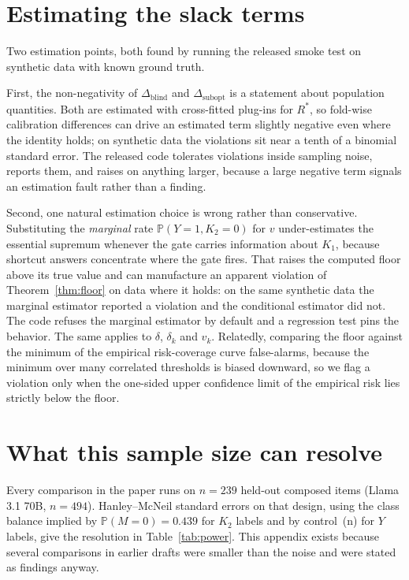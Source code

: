 \documentclass{article}
\begin{document}
\section{Estimating the slack terms}
\label{app:estimation}

Two estimation points, both found by running the released smoke test on synthetic data with known
ground truth.

First, the non-negativity of $\Delta_{\mathrm{blind}}$ and $\Delta_{\mathrm{subopt}}$ is a statement
about population quantities. Both are estimated with cross-fitted plug-ins for $R^\ast$, so fold-wise
calibration differences can drive an estimated term slightly negative even where the identity holds;
on synthetic data the violations sit near a tenth of a binomial standard error. The released code
tolerates violations inside sampling noise, reports them, and raises on anything larger, because a
large negative term signals an estimation fault rather than a finding.

Second, one natural estimation choice is wrong rather than conservative. Substituting the
\emph{marginal} rate $\mathbb{P}(Y=1,K_2=0)$ for $v$ under-estimates the essential supremum whenever
the gate carries information about $K_1$, because shortcut answers concentrate where the gate fires.
That raises the computed floor above its true value and can manufacture an apparent violation of
Theorem~\ref{thm:floor} on data where it holds: on the same synthetic data the marginal estimator
reported a violation and the conditional estimator did not. The code refuses the marginal estimator by
default and a regression test pins the behavior. The same applies to $\delta$, $\delta_k$ and $v_k$.
Relatedly, comparing the floor against the minimum of the empirical risk-coverage curve false-alarms,
because the minimum over many correlated thresholds is biased downward, so we flag a violation only
when the one-sided upper confidence limit of the empirical risk lies strictly below the floor.

\section{What this sample size can resolve}
\label{app:power}

Every comparison in the paper runs on $n{=}239$ held-out composed items (Llama 3.1 70B, $n{=}494$).
Hanley--McNeil standard errors on that design, using the class balance implied by
$\mathbb{P}(M{=}0)=0.439$ for $K_2$ labels and by control~(n) for $Y$ labels, give the resolution
in Table~\ref{tab:power}. This appendix exists because several comparisons in earlier drafts were
smaller than the noise and were stated as findings anyway.
\end{document}
